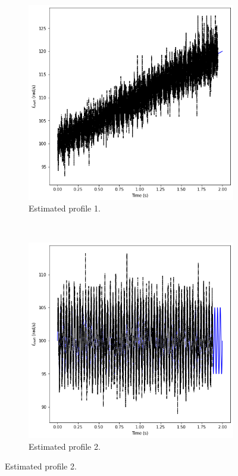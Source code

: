 \documentclass{article}
\begin{document}
	\begin{figure}[htb!]
		\centering
		\begin{subfigure}[b]{0.45\textwidth}
			\centering
			\includegraphics[width=\textwidth]{Q4_f1_3.png}
			\caption{Estimated profile 1.}
		\end{subfigure}
		~
		\begin{subfigure}[b]{0.45\textwidth}
			\centering
			\includegraphics[width=\textwidth]{Q4_f2_3.png}
			\caption{Estimated profile 2.}
		\end{subfigure}
		

\end{figure}
\end{document}
